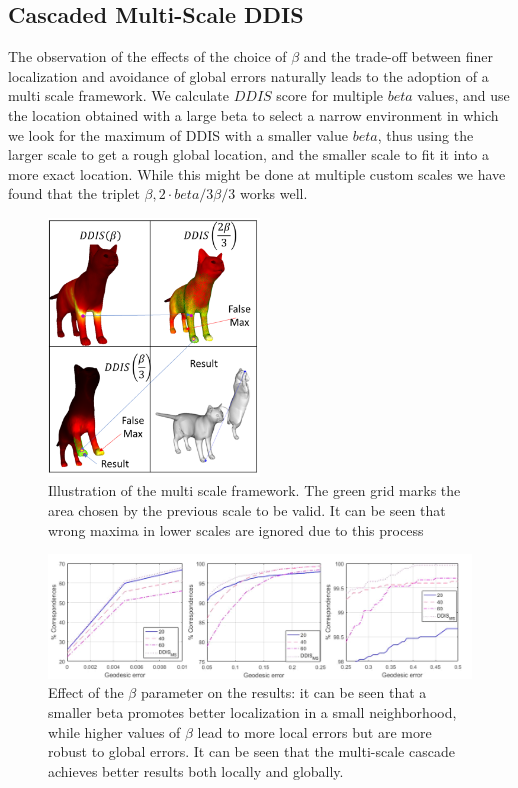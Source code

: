 \documentclass[10pt,twocolumn,letterpaper]{article}
\begin{document}
\subsection{Cascaded Multi-Scale DDIS}
The observation of the effects of the choice of $\beta$ and the trade-off between finer localization and avoidance of global errors naturally leads to the adoption of a multi scale framework. We calculate $DDIS$ score for multiple $beta$ values, and use the location obtained with a large beta to select a narrow environment in which we look for the maximum of DDIS with a smaller value $beta$, thus using the larger scale to get a rough global location, and the smaller scale to fit it into a more exact location. While this might be done at multiple custom scales we have found that the triplet $\beta ,2\cdot beta/3\beta/3$ works well.
\begin{figure}[htb]
	\includegraphics[width=0.5\textwidth]{figures/MultiScaleDis.png}
	\caption{Illustration of the multi scale framework. The green grid marks the area chosen by the previous scale to be valid. It can be seen that wrong maxima in lower scales are ignored due to this process}
\end{figure}

\begin{figure}
	\centering
	\includegraphics[width=1\textwidth]{figures/AblationStudyThreshold.png}
	\caption{Effect of the $\beta$ parameter on the results: it can be seen that a smaller beta promotes better localization in a small neighborhood, while higher values of $\beta$ lead to more local errors but are more robust to global errors. It can be seen that the multi-scale cascade achieves better results both locally and globally.}
\end{figure}
\end{document}

